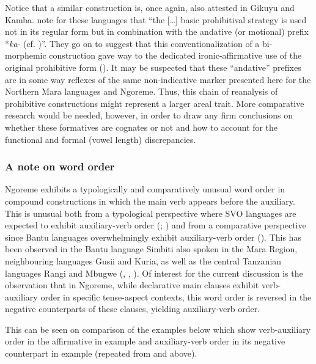 \documentclass[output=paper,colorlinks,citecolor=brown,draftmode]{langscibook}
\begin{document}
Notice that a similar construction is, once again, also attested in Gikuyu and Kamba. \citet[27]{DevosVanOlmen2013} note for these languages that “the […] basic prohibitival strategy is used not in its regular form but in combination with the andative (or motional) prefix *\textit{ka}{}- (cf. \citealt[109]{Meeussen1962})”. They go on to suggest that this conventionalization of a bi-morphemic construction gave way to the dedicated ironic-affirmative use of the original prohibitive form (\citealt[47--48]{DevosVanOlmen2013}). It may be suspected that these “andative” prefixes are in some way reflexes of the same non-indicative marker presented here for the Northern Mara languages and Ngoreme. Thus, this chain of reanalysis of prohibitive constructions might represent a larger areal trait. More comparative research would be needed, however, in order to draw any firm conclusions on whether these formatives are cognates or not and how to account for the functional and formal (vowel length) discrepancies. 

\subsubsection{A note on word order}\label{sec:ngo:4.9}

Ngoreme exhibits a typologically and comparatively unusual word order in compound constructions in which the main verb appears before the auxiliary. This is unusual both from a typological perspective where SVO languages are expected to exhibit auxiliary-verb order (\citealt{Dryer1992}; \citealt{Greenberg1966universals}) and from a comparative perspective since Bantu languages overwhelmingly exhibit auxiliary-verb order (\citealt{Gibson2019, Gibson2021}). This has been observed in the Bantu language Simbiti also spoken in the Mara Region, neighbouring languages Gusii and Kuria, as well as the central Tanzanian languages Rangi and Mbugwe (\citealt{GibsonMarten2019}, \citealt{Gibson2019}, \citealt{RothGibson2019}). Of interest for the current discussion is the observation that in Ngoreme, while declarative main clauses exhibit verb-auxiliary order in specific tense-aspect contexts, this word order is reversed in the negative counterparts of these clauses, yielding auxiliary-verb order. 

This can be seen on comparison of the examples below which show verb-auxiliary order in the affirmative in example  and auxiliary-verb order in its negative counterpart in example  (repeated from  and  above).
\end{document}
